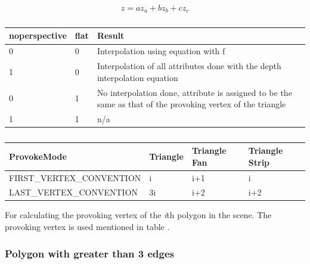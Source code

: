 \begin{equation}\label{eqn:depthInterpolation}
    z = az_a + bz_b + cz_c
\end{equation}

\begin{table}[ht]
    \begin{tabular}{|l|l|l|}
    \hline
    noperspective & flat & Result                                                                                                      \\ \hline
    0             & 0    & Interpolation using equation with f                                                                         \\ \hline
    1             & 0    & Interpolation of all attributes done with the depth interpolation equation                                  \\ \hline
    0             & 1    & No interpolation done, attribute is assigned to be the same as that of the provoking vertex of the triangle \\ \hline
    1             & 1    & n/a                                                                                                         \\ \hline
    \end{tabular}
    \caption{}
    \label{table:interpolationFlags}
\end{table}

\begin{table}[ht]
    \begin{tabular}{|l|l|l|l|}
    \hline
    ProvokeMode               & Triangle & Triangle Fan & Triangle   Strip \\ \hline
    FIRST\_VERTEX\_CONVENTION & i        & i+1          & i                \\ \hline
    LAST\_VERTEX\_CONVENTION  & 3i       & i+2          & i+2              \\ \hline
    \end{tabular}
    \caption{}
    \label{table:provokeModeSettings}
\end{table}

For calculating the provoking vertex of the \textit{i}th polygon in the scene.
The provoking vertex is used mentioned in table .

\subsubsection{Polygon with greater than 3 edges}

